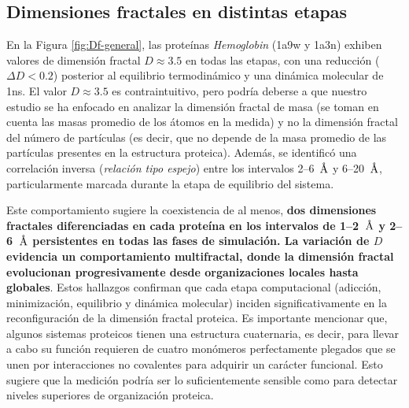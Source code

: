 	\subsection{Dimensiones fractales en distintas etapas}	
	\label{DFE}
	
	En la Figura \ref{fig:Df-general}, las prote\'{i}nas \textit{Hemoglobin} (1a9w y 1a3n) exhiben valores de dimensi\'{o}n fractal $D \approx 3.5$ en todas las etapas, con una reducci\'{o}n  ($\Delta D < 0.2$) posterior al equilibrio termodin\'{a}mico y una din\'{a}mica molecular de 1ns. El valor $D \approx 3.5$  es contraintuitivo, pero podr\'{i}a deberse a que nuestro estudio se ha enfocado en analizar la dimensi\'{o}n fractal de masa (se toman en cuenta las masas promedio de los \'{a}tomos en la medida) y no la dimensi\'{o}n fractal del n\'{u}mero de part\'{i}culas (es decir, que no depende de la masa promedio de las part\'{i}culas presentes en la estructura proteica). Adem\'{a}s, se identific\'{o} una correlaci\'{o}n inversa (\emph{relaci\'{o}n tipo espejo}) entre los intervalos 2--6~$\textup{\r{A}}$ y 6--20~$\textup{\r{A}}$, particularmente marcada durante la etapa de equilibrio del sistema.
	
	Este comportamiento sugiere la coexistencia de al menos, \textbf{dos dimensiones fractales diferenciadas en cada prote\'{i}na en los intervalos de 1--2~$\textup{\r{A}}$ y 2--6~$\textup{\r{A}}$ persistentes en todas las fases de simulaci\'{o}n. La variaci\'{o}n de $D$ evidencia un comportamiento multifractal, donde la dimensi\'{o}n fractal evolucionan progresivamente desde organizaciones locales hasta globales}. Estos hallazgos confirman que cada etapa computacional (adicci\'{o}n, minimizaci\'{o}n, equilibrio y din\'{a}mica molecular) inciden significativamente en la reconfiguraci\'{o}n de la dimensi\'{o}n fractal proteica. Es importante mencionar que, algunos sistemas proteicos tienen una estructura cuaternaria, es decir, para llevar a cabo su funci\'{o}n requieren de cuatro mon\'{o}meros perfectamente plegados que se unen por interacciones no covalentes para adquirir un car\'{a}cter funcional. Esto sugiere que la medici\'{o}n podr\'{i}a ser lo suficientemente sensible como para detectar niveles superiores de organizaci\'{o}n proteica.
	
